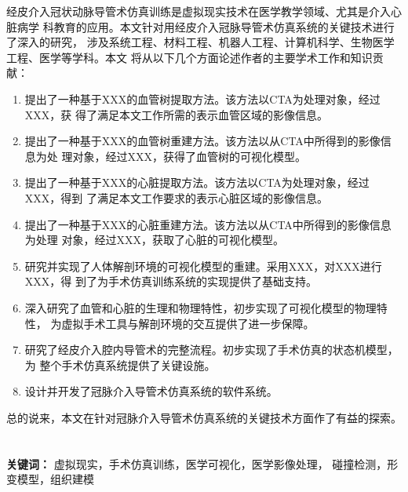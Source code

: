 经皮介入冠状动脉导管术仿真训练是虚拟现实技术在医学教学领域、尤其是介入心脏病学
科教育的应用。本文针对用经皮介入冠脉导管术仿真系统的关键技术进行了深入的研究，
涉及系统工程、材料工程、机器人工程、计算机科学、生物医学工程、医学等学科。本文
将从以下几个方面论述作者的主要学术工作和知识贡献：
\begin{enumerate}
    \item 提出了一种基于XXX的血管树提取方法。该方法以CTA为处理对象，经过XXX，获
    得了满足本文工作所需的表示血管区域的影像信息。
    \item 提出了一种基于XXX的血管树重建方法。该方法以从CTA中所得到的影像信息为处
    理对象，经过XXX，获得了血管树的可视化模型。
    \item 提出了一种基于XXX的心脏提取方法。该方法以CTA为处理对象，经过XXX，得到
    了满足本文工作要求的表示心脏区域的影像信息。
    \item 提出了一种基于XXX的心脏重建方法。该方法以从CTA中所得到的影像信息为处理
    对象，经过XXX，获取了心脏的可视化模型。
    \item 研究并实现了人体解剖环境的可视化模型的重建。采用XXX，对XXX进行XXX，得
    到了为手术仿真训练系统的实现提供了基础支持。
    \item 深入研究了血管和心脏的生理和物理特性，初步实现了可视化模型的物理特性，
    为虚拟手术工具与解剖环境的交互提供了进一步保障。
    \item 研究了经皮介入腔内导管术的完整流程。初步实现了手术仿真的状态机模型，为
    整个手术仿真系统提供了关键设施。
    \item 设计并开发了冠脉介入导管术仿真系统的软件系统。
\end{enumerate}
总的说来，本文在针对冠脉介入导管术仿真系统的关键技术方面作了有益的探索。
\\
\\
\\
\noindent \textbf{关键词：} 虚拟现实，手术仿真训练，医学可视化，医学影像处理，
碰撞检测，形变模型，组织建模
